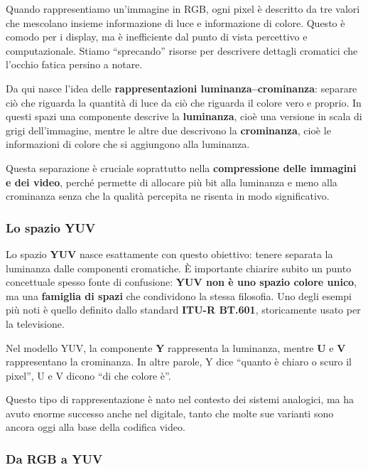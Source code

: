 \documentclass[
]{article}
\begin{document}
Quando rappresentiamo un'immagine in RGB, ogni pixel è descritto da tre valori che mescolano insieme informazione di luce e informazione di colore. Questo è comodo per i display, ma è inefficiente dal punto di vista percettivo e computazionale. Stiamo ``sprecando'' risorse per descrivere dettagli cromatici che l'occhio fatica persino a notare.

Da qui nasce l'idea delle \textbf{rappresentazioni luminanza--crominanza}: separare ciò che riguarda la quantità di luce da ciò che riguarda il colore vero e proprio. In questi spazi una componente descrive la \textbf{luminanza}, cioè una versione in scala di grigi dell'immagine, mentre le altre due descrivono la \textbf{crominanza}, cioè le informazioni di colore che si aggiungono alla luminanza.

Questa separazione è cruciale soprattutto nella \textbf{compressione delle immagini e dei video}, perché permette di allocare più bit alla luminanza e meno alla crominanza senza che la qualità percepita ne risenta in modo significativo.

\hypertarget{lo-spazio-yuv}{%
\subsubsection{Lo spazio YUV}\label{lo-spazio-yuv}}

Lo spazio \textbf{YUV} nasce esattamente con questo obiettivo: tenere separata la luminanza dalle componenti cromatiche. È importante chiarire subito un punto concettuale spesso fonte di confusione: \textbf{YUV non è uno spazio colore unico}, ma una \textbf{famiglia di spazi} che condividono la stessa filosofia. Uno degli esempi più noti è quello definito dallo standard \textbf{ITU-R BT.601}, storicamente usato per la televisione.

Nel modello YUV, la componente \textbf{Y} rappresenta la luminanza, mentre \textbf{U} e \textbf{V} rappresentano la crominanza. In altre parole, Y dice ``quanto è chiaro o scuro il pixel'', U e V dicono ``di che colore è''.

Questo tipo di rappresentazione è nato nel contesto dei sistemi analogici, ma ha avuto enorme successo anche nel digitale, tanto che molte sue varianti sono ancora oggi alla base della codifica video.

\hypertarget{da-rgb-a-yuv}{%
\subsubsection{Da RGB a YUV}\label{da-rgb-a-yuv}}
\end{document}
